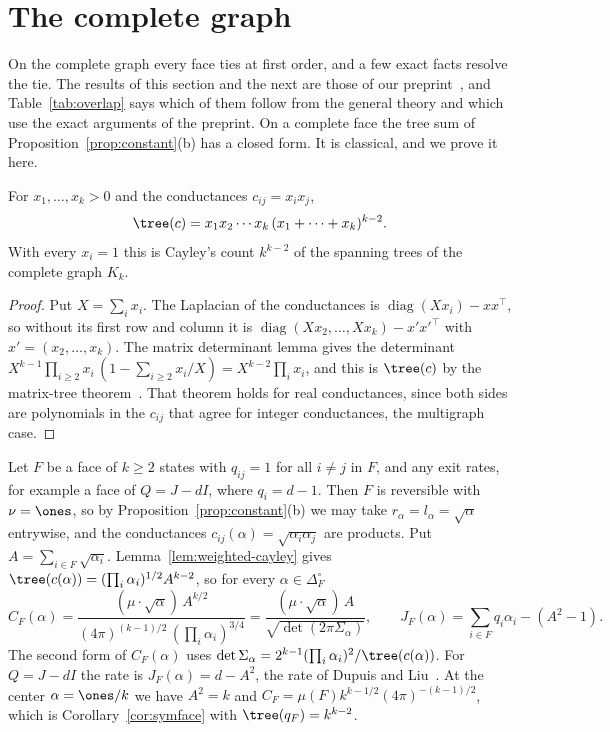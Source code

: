 \section{The complete graph}\label{sec:complete}\label{sec:completegraph}

On the complete graph every face ties at first order, and a few exact facts resolve the
tie. The results of this section and the next are those of our preprint~\cite{paperB}, and
Table~\ref{tab:overlap} says which of them follow from the general theory and which use the
exact arguments of the preprint. On a complete face the tree sum of Proposition~\ref{prop:constant}(b) has a closed form. It is
classical, and we prove it here.

\begin{lemma}\label{lem:weighted-cayley}
For $x_1,\ldots,x_k>0$ and the conductances $c_{ij}=x_ix_j$,
\[
\tree(c)=x_1x_2\cdots x_k\,(x_1+\cdots+x_k)^{k-2}.
\]
With every $x_i=1$ this is Cayley's count $k^{k-2}$ of the spanning trees of
the complete graph $K_k$.
\end{lemma}

\begin{proof}
Put $X=\sum_ix_i$. The Laplacian of the conductances is $\operatorname{diag}(Xx_i)-xx^\top$,
so without its first row and column it is
$\operatorname{diag}(Xx_2,\ldots,Xx_k)-x'x'^\top$ with $x'=(x_2,\ldots,x_k)$. The
matrix determinant lemma gives the determinant
$X^{k-1}\prod_{i\ge2}x_i\,(1-\sum_{i\ge2}x_i/X)=X^{k-2}\prod_ix_i$, and this is
$\tree(c)$ by the matrix-tree theorem~\cite{bollobas1998}. That theorem holds for real
conductances, since both sides are polynomials in the $c_{ij}$ that agree for integer
conductances, the multigraph case.
\end{proof}

\begin{example}\label{ex:complete-face}
Let $F$ be a face of $k\ge2$ states with $q_{ij}=1$ for all $i\ne j$ in $F$, and
any exit rates, for example a face of $Q=J-dI$, where $q_i=d-1$. Then $F$ is
reversible with $\nu=\ones$, so by Proposition~\ref{prop:constant}(b) we may take
$r_\alpha=l_\alpha=\sqrt\alpha$ entrywise, and the conductances
$c_{ij}(\alpha)=\sqrt{\alpha_i\alpha_j}$ are products. Put
$A=\sum_{i\in F}\sqrt{\alpha_i}$. Lemma~\ref{lem:weighted-cayley} gives
$\tree(c(\alpha))=(\prod_i\alpha_i)^{1/2}A^{k-2}$, so for every
$\alpha\in\Delta_F^\circ$
\[
C_F(\alpha)=\frac{(\mu\cdot\sqrt\alpha)\,A^{k/2}}{(4\pi)^{(k-1)/2}\,(\prod_i\alpha_i)^{3/4}}
=\frac{(\mu\cdot\sqrt\alpha)\,A}{\sqrt{\det(2\pi\Sigma_\alpha)}},\qquad
J_F(\alpha)=\sum_{i\in F}q_i\alpha_i-(A^2-1).
\]
The second form of $C_F(\alpha)$ uses $\det\Sigma_\alpha=2^{k-1}(\prod_i\alpha_i)^2/\tree(c(\alpha))$.
For $Q=J-dI$ the rate is $J_F(\alpha)=d-A^2$, the rate of Dupuis and
Liu~\cite[Eq.~(3.2)]{dupuisliu2015}. At the center $\alpha=\ones/k$ we have $A^2=k$
and $C_F=\mu(F)k^{k-1/2}(4\pi)^{-(k-1)/2}$, which is Corollary~\ref{cor:symface}
with $\tree(q_F)=k^{k-2}$.
\end{example}

